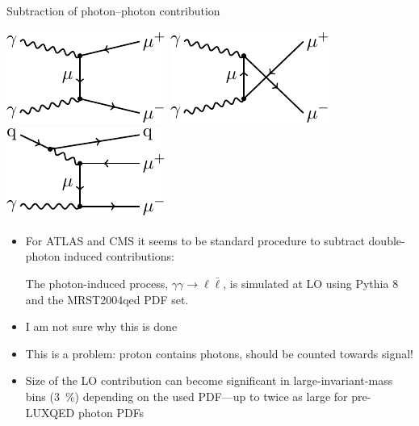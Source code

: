 \begin{frame}{Subtraction of photon--photon contribution}
\begin{center}
\includegraphics[height=0.2\textheight]{ew_corrections/figures/fd02_born_photon_t_channel}
\includegraphics[height=0.2\textheight]{ew_corrections/figures/fd03_born_photon_u_channel}
\includegraphics[height=0.2\textheight]{ew_corrections/figures/fd06_photon_quark_real}
\end{center}
\vspace*{\fill}
\begin{itemize}
\item For ATLAS and CMS it seems to be standard procedure to subtract double-photon induced contributions:
\begin{displayquote}
The photon-induced process, $\gamma\gamma \to \ell \bar{\ell}$, is simulated at LO using Pythia 8 and the MRST2004qed PDF set.
\end{displayquote}
\item I am not sure why this is done
\item This is a problem: proton contains photons, should be counted towards signal!
\item Size of the LO contribution can become significant in large-invariant-mass bins (\SI{3}{\percent}) depending on the used PDF---up to twice as large for pre-LUXQED photon PDFs
\end{itemize}
\end{frame}

